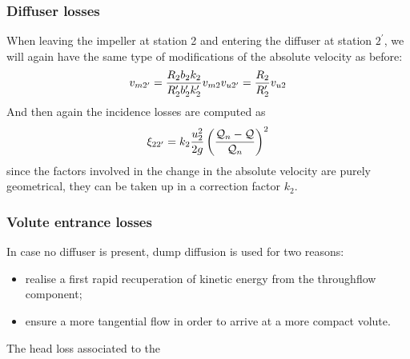 \subsubsection{Diffuser losses}

When leaving the impeller at station 2 and entering the diffuser at
station $2^\prime$, we will again have the same type of modifications
of the absolute velocity as before:
\begin{align*}
  v_{m2^\prime} = \frac{R_{2} b_{2} k_{2}}{R_2^\prime b_2^\prime k_2^\prime} 
  v_{m2}
  v_{u2^\prime} = \frac{R_{2}}{R_2^\prime} v_{u2}
\end{align*}
And then again the incidence losses are computed as 
\begin{align*}
  \xi_{22^\prime} = k_2 \frac{u^2_2}{2g} 
  \left(\frac{\mathcal Q_n-\mathcal Q}{\mathcal Q_n}\right)^2
\end{align*}
since the factors involved in the change in the absolute velocity are
purely geometrical, they can be taken up in a correction factor $k_2$.  

\subsubsection{Volute entrance losses}

In case no diffuser is present, dump diffusion is used for two reasons:
\begin{itemize}
\item realise a first rapid recuperation of kinetic energy from the
  throughflow component;
\item ensure a more tangential flow in order to arrive at a more
  compact volute.
\end{itemize}
The head loss associated to the 


\def\Q{10}
\def\Qn{3}
\def\Qm{9}
\def\Hm{4}
\begin{figure}[!h]
  \centering{}
\end{figure}


